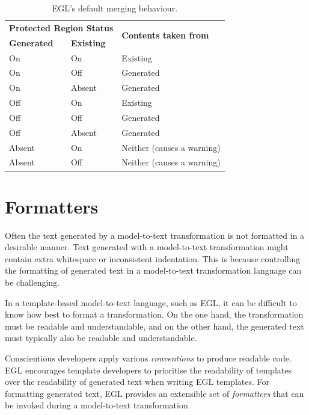 \begin{table}[htbp]
  \begin{center}
  \begin{tabular}{|l|l|l|}
  \hline
  \multicolumn{2}{|l|}{\textbf{Protected Region Status}} & \multirow{2}{*}{\textbf{Contents taken from}} \\
  \textbf{Generated} & \textbf{Existing} & \\
  \hline
  On & On     & Existing  \\
  On & Off    & Generated \\
  On & Absent & Generated \\
  \hline
  Off & On     & Existing  \\
  Off & Off    & Generated \\
  Off & Absent & Generated \\
  \hline
  Absent & On  & Neither (causes a warning) \\
  Absent & Off & Neither (causes a warning) \\
  \hline
  \end{tabular}
  \end{center}
\caption{EGL's default merging behaviour.}
\label{tab:merging}
\end{table}

\section{Formatters}
\label{sec:formatters}
Often the text generated by a model-to-text transformation is not formatted in a desirable  manner. Text generated with a model-to-text transformation might contain extra whitespace or inconsistent indentation. This is because controlling the formatting of generated text in a model-to-text transformation language can be challenging.

In a template-based model-to-text language, such as EGL, it can be difficult to know how best to format a transformation. On the one hand, the transformation must be readable and understandable, and on the other hand, the generated text must typically also be readable and understandable. 

Conscientious developers apply various \emph{conventions} to produce readable code. EGL encourages template developers to prioritise the readability of templates over the readability of generated text when 
writing EGL templates. For formatting generated text, EGL provides an extensible set of \textit{formatters} that can be invoked during a model-to-text transformation.

